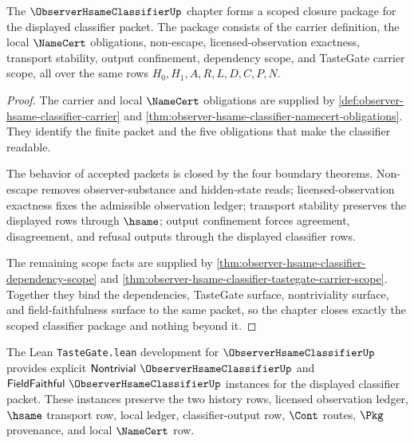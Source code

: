 \begin{theorem}
\label{thm:observer-hsame-classifier-scoped-closure-package}
The $\ObserverHsameClassifierUp$ chapter forms a scoped closure package for the displayed classifier packet. The package consists of the carrier definition, the local $\NameCert$ obligations, non-escape, licensed-observation exactness, transport stability, output confinement, dependency scope, and TasteGate carrier scope, all over the same rows $H_0,H_1,A,R,L,D,C,P,N$.
\end{theorem}
\begin{proof}
The carrier and local $\NameCert$ obligations are supplied by \autoref{def:observer-hsame-classifier-carrier} and \autoref{thm:observer-hsame-classifier-namecert-obligations}. They identify the finite packet and the five obligations that make the classifier readable.

The behavior of accepted packets is closed by the four boundary theorems. Non-escape removes observer-substance and hidden-state reads; licensed-observation exactness fixes the admissible observation ledger; transport stability preserves the displayed rows through $\hsame$; output confinement forces agreement, disagreement, and refusal outputs through the displayed classifier rows.

The remaining scope facts are supplied by \autoref{thm:observer-hsame-classifier-dependency-scope} and \autoref{thm:observer-hsame-classifier-tastegate-carrier-scope}. Together they bind the dependencies, TasteGate surface, nontriviality surface, and field-faithfulness surface to the same packet, so the chapter closes exactly the scoped classifier package and nothing beyond it.
\end{proof}

The Lean \texttt{TasteGate.lean} development for $\ObserverHsameClassifierUp$ provides explicit $\mathsf{Nontrivial}\ \ObserverHsameClassifierUp$ and $\mathsf{FieldFaithful}\ \ObserverHsameClassifierUp$ instances for the displayed classifier packet. These instances preserve the two history rows, licensed observation ledger, $\hsame$ transport row, local ledger, classifier-output row, $\Cont$ routes, $\Pkg$ provenance, and local $\NameCert$ row.


